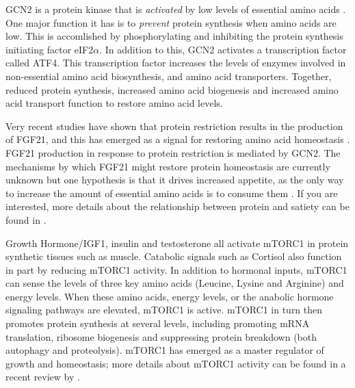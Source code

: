 \documentclass{tufte-handout}
\begin{document}
  GCN2 is a protein kinase that is \emph{activated} by low levels of essential amino acids \citep{Castilho2014}.  One major function it has is to \emph{prevent} protein synthesis when amino acids are low.  This is accomlished by phosphorylating and inhibiting the protein synthesis initiating factor eIF2$\alpha$.  In addition to this, GCN2 activates a transcription factor called ATF4.  This transcription factor increases the levels of enzymes involved in non-essential amino acid biosynthesis, and amino acid transporters.  Together, reduced protein synthesis, increased amino acid biogenesis and increased amino acid transport function to restore amino acid levels.  

  Very recent studies have shown that protein restriction results in the production of FGF21, and this has emerged as a signal for restoring amino acid homeostasis \citep{Laeger2014}.  FGF21 production in response to protein restriction is mediated by GCN2.  The mechanisms by which FGF21 might restore protein homeostasis are currently unknown but one hypothesis is that it drives increased appetite, as the only way to increase the amount of essential amino acids is to consume them \citep{Solon-Biet2016a}.  If you are interested, more details about the relationship between protein and satiety can be found in \citet{Morrison2015}.

  Growth Hormone/IGF1, insulin and testosterone all activate mTORC1 in protein synthetic tissues such as muscle.  Catabolic signals such as Cortisol also function in part by reducing mTORC1 activity.  In addition to hormonal inputs, mTORC1 can sense the levels of three key amino acids (Leucine, Lysine and Arginine) and energy levels.  When these amino acids, energy levels, or the anabolic hormone signaling pathways are elevated, mTORC1 is active.  mTORC1 in turn then promotes protein synthesis at several levels, including promoting mRNA translation, ribosome biogenesis and suppressing protein breakdown (both autophagy and proteolysis).  mTORC1 has emerged as a master regulator of growth and homeostasis; more details about mTORC1 activity can be found in a recent review by \citet{Saxton2017}.
\end{document}
